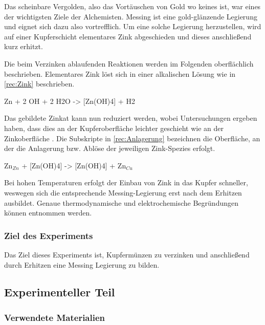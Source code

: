 \documentclass{article}
\begin{document}
        Das scheinbare Vergolden, also das Vortäuschen von Gold wo keines ist, war eines der wichtigsten Ziele der Alchemisten. Messing ist eine gold-glänzende Legierung und eignet sich dazu also vortrefflich. Um eine solche Legierung herzustellen, wird auf einer Kupferschicht elementares Zink abgeschieden und dieses anschließend kurz erhitzt. 
        
        Die beim Verzinken ablaufenden Reaktionen werden im Folgenden oberflächlich beschrieben. Elementares Zink löst sich in einer alkalischen Lösung wie in \ref{rec:Zink} beschrieben. 
        
        \begin{reaction}
          Zn\sld{} + 2 OH\mch\aq{} + 2 H2O -> [Zn(OH)4]\mch[2]\aq{} + H2\gas \label{rec:Zink}
        \end{reaction}
        
        Das gebildete Zinkat kann nun reduziert werden, wobei Untersuchungen ergeben haben, dass dies an der Kupferoberfläche leichter geschieht wie an der Zinkoberfläche \cite{TheGoldenPenny}. Die Subskripte in \ref{rec:Anlagerung} bezeichnen die Oberfläche, an der die Anlagerung bzw. Ablöse der jeweiligen Zink-Spezies erfolgt.
        
        \begin{reaction}
          Zn$_{Zn}$ + [Zn(OH)4]\mch[2]\aq{} -> [Zn(OH)4]\mch[2]\aq{} + Zn$_{Cu}$ \label{rec:Anlagerung}
        \end{reaction}
        
        Bei hohen Temperaturen erfolgt der Einbau von Zink in das Kupfer schneller, weswegen sich die entsprechende Messing-Legierung erst nach dem Erhitzen ausbildet. Genaue thermodynamische und elektrochemische Begründungen können \cite{TheGoldenPenny} entnommen werden.
        
      \subsubsection{Ziel des Experiments}
        
        Das Ziel dieses Experiments ist, Kupfermünzen zu verzinken und anschließend durch Erhitzen eine Messing Legierung zu bilden.         
    
    \subsection{Experimenteller Teil}
    
      \subsubsection{Verwendete Materialien}
      
\end{document}
